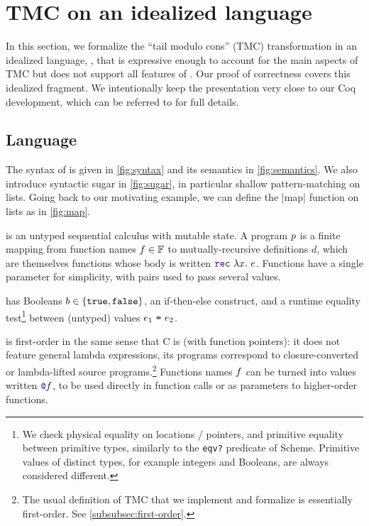 \section{TMC on an idealized language}
\label{sec:formalization}

In this section, we formalize the ``tail modulo cons'' (TMC) transformation in an idealized language, \DataLang, that is expressive enough to account for the main aspects of TMC but does not support all features of \OCaml.
Our proof of correctness covers this idealized fragment.
We intentionally keep the presentation very close to our Coq development, which can be referred to for full details.






\subsection{Language}

The syntax of \DataLang is given in \cref{fig:syntax} and its semantics in \cref{fig:semantics}.
We also introduce syntactic sugar in \cref{fig:sugar}, in particular shallow pattern-matching on lists.
Going back to our motivating example, we can define the \datalang|map| function on lists as in \cref{fig:map}.

\DataLang is an untyped sequential calculus with mutable state. A \DataLang program $\datalangProg$ is a finite mapping from function names $\datalangFn \in \datalangFn[]$ to mutually-recursive definitions $d$, which are themselves functions whose body is written $\datalangRec \datalangVar \datalangExpr$. Functions have a single parameter for simplicity, with pairs used to pass several values.

\DataLang has Booleans $b \in \{\texttt{true}, \texttt{false}\}$, an if-then-else construct, and a runtime equality test\footnote{We check physical equality on locations / pointers, and primitive equality between primitive types, similarly to the \texttt{eqv?} predicate of Scheme. Primitive values of distinct types, for example integers and Booleans, are always considered different.} between (untyped) values $\datalangEq{\datalangExpr_1}{\datalangExpr_2}$.

\DataLang is first-order in the same sense that C is (with function pointers): it does not feature general lambda expressions, its programs correspond to closure-converted or lambda-lifted source programs.\footnote{
The usual definition of TMC that we implement and formalize is essentially first-order. See \cref{subsubsec:first-order}.}
Functions names $\datalangFn$ can be turned into values written $\datalangFnptr{\datalangFn}$, to be used directly in function calls or as parameters to higher-order functions.

